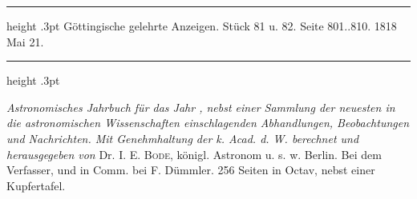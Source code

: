 \par\bigskip
\hypertarget{native-610-lower}{}
\begin{center}
\parbox{.78\linewidth}{%
\centering\small
\hrule height .3pt\relax\vspace{2.5pt}
Göttingische gelehrte Anzeigen. Stück 81 u. 82. Seite 801..810. 1818 Mai 21.\par
\vspace{2.5pt}\hrule height .3pt\relax
}
\end{center}

\emph{Astronomisches Jahrbuch für das Jahr {}, nebst einer Sammlung der neuesten in die astronomischen Wissenschaften einschlagenden Abhandlungen, Beobachtungen und Nachrichten. Mit Genehmhaltung der k. Acad. d. W. berechnet und herausgegeben von} Dr. I. E. \textsc{Bode}, königl. Astronom u. s. w. Berlin. Bei dem Verfasser, und in Comm. bei F. Dümmler. 256 Seiten in Octav, nebst einer Kupfertafel.

